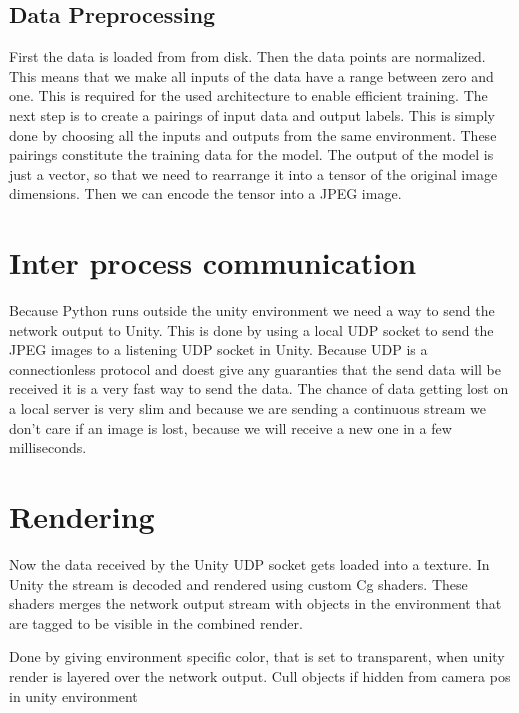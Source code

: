 \subsection{Data Preprocessing}
First the data is loaded from from disk. Then the data points are normalized. This means that we make all inputs of the data have a range between zero and one. This is required for the used architecture to enable efficient training. The next step is to create a pairings of input data and output labels. This is simply done by choosing all the inputs and outputs from the same environment. These pairings constitute the training data for the model. The output of the model is just a vector, so that we need to rearrange it into a tensor of the original image dimensions. Then we can encode the tensor into a JPEG image.


\section[IPC]{Inter process communication}
Because Python runs outside the unity environment we need a way to send the network output to Unity. This is done by using a local UDP socket to send the JPEG images to a listening UDP socket in Unity. Because UDP is a connectionless protocol and doest give any guaranties that the send data will be received it is a very fast way to send the data. The chance of data getting lost on a local server is very slim and because we are sending a continuous stream we don't care if an image is lost, because we will receive a new one in a few milliseconds.


\section{Rendering}
Now the data received by the Unity UDP socket gets loaded into a texture.
In Unity the stream is decoded and rendered using custom Cg shaders. These shaders merges the network output stream with objects in the environment that are tagged to be visible in the combined render.

Done by giving environment specific color, that is set to transparent, when unity render is layered over the network output.
Cull objects if hidden from camera pos in unity environment
